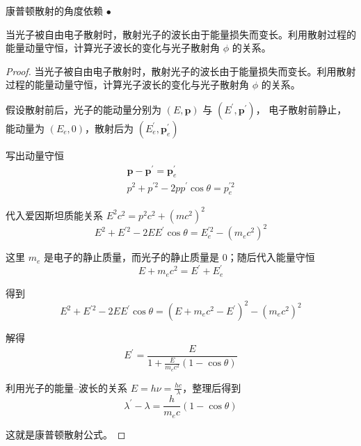 \begin{6}
   康普顿散射的角度依赖 $\bullet$

当光子被自由电子散射时，散射光子的波长由于能量损失而变长。利用散射过程的能量动量守恒，计算光子波长的变化与光子散射角 $\phi$ 的关系。
\end{6}
\begin{proof}
当光子被自由电子散射时，散射光子的波长由于能量损失而变长。利用散射过程的能量动量守恒，计算光子波长的变化与光子散射角 $\phi$ 的关系。

假设散射前后，光子的能动量分别为 $(E, \mathbf{p})$ 与 $(E^{\prime}, \mathbf{p}^{\prime})$，
电子散射前静止，能动量为 $(E_{e}, 0)$，散射后为 $(E_{e}^{\prime}, \mathbf{p}_{e}^{\prime})$

写出动量守恒
$$
\begin{gathered}
\mathbf{p}-\mathbf{p}^{\prime}=\mathbf{p}_{e}^{\prime} \\
p^{2}+p^{\prime 2}-2 p p^{\prime} \cos \theta=p_{e}^{\prime 2}
\end{gathered}
$$

代入爱因斯坦质能关系 $E^{2} c^{2}=p^{2} c^{2}+\left(m c^{2}\right)^{2}$
$$E^{2}+E^{\prime 2}-2 E E^{\prime} \cos \theta
=E_{e}^{\prime 2}-\left(m_{e} c^{2}\right)^{2}$$

这里 $m_{e}$ 是电子的静止质量，而光子的静止质量是 $0$；随后代入能量守恒
$$E+m_{e} c^{2}=E^{\prime}+E_{e}^{\prime}$$

得到
$$E^{2}+E^{\prime 2}-2 E E^{\prime} \cos \theta
=\left(E+m_{e} c^{2}-E^{\prime}\right)^{2}-\left(m_{e} c^{2}\right)^{2}$$

解得
$$E^{\prime}=\frac{E}{1+\frac{E}{m_{e} c^{2}}(1-\cos \theta)}$$

利用光子的能量--波长的关系 $E=h \nu=\frac{h c}{\lambda}$，整理后得到
$$\lambda^{\prime}-\lambda=\frac{h}{m_{e} c}(1-\cos \theta)$$

这就是康普顿散射公式。
\end{proof}

